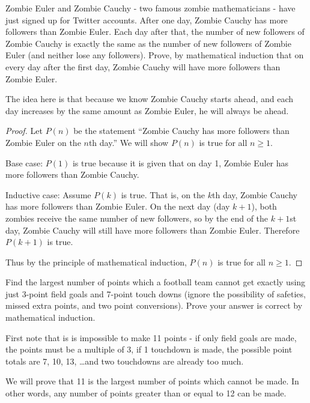 \documentclass[11pt]{exam}
\begin{document}
\begin{questions}
\question[4] Zombie Euler and Zombie Cauchy - two famous zombie mathematicians - have just signed up for Twitter accounts.  After one day, Zombie Cauchy has more followers than Zombie Euler.  Each day after that, the number of new followers of Zombie Cauchy is exactly the same as the number of new followers of Zombie Euler (and neither lose any followers).  Prove, by mathematical induction that on every day after the first day, Zombie Cauchy will have more followers than Zombie Euler.

\begin{solution}
  The idea here is that because we know Zombie Cauchy starts ahead, and each day increases by the same amount as Zombie Euler, he will always be ahead.
  
  \begin{proof}
    Let $P(n)$ be the statement ``Zombie Cauchy has more followers than Zombie Euler on the $n$th day.''  We will show $P(n)$ is true for all $n \ge 1$.
    
    Base case: $P(1)$ is true because it is given that on day 1, Zombie Euler has more followers than Zombie Cauchy.
    
    Inductive case: Assume $P(k)$ is true.  That is, on the $k$th day, Zombie Cauchy has more followers than Zombie Euler.  On the next day (day $k+1$), both zombies receive the same number of new followers, so by the end of the $k+1$st day, Zombie Cauchy will still have more followers than Zombie Euler.  Therefore $P(k+1)$ is true.
    
    Thus by the principle of mathematical induction, $P(n)$ is true for all $n \ge 1$.
  \end{proof}

\end{solution}


\question[4] Find the largest number of points which a football team cannot get exactly using just 3-point field goals and 7-point touch downs (ignore the possibility of safeties, missed extra points, and two point conversions).  Prove your answer is correct by mathematical induction.

\begin{solution}
  First note that is is impossible to make 11 points - if only field goals are made, the points must be a multiple of 3, if 1 touchdown is made, the possible point totals are 7, 10, 13, \ldots and two touchdowns are already too much.
  
  We will prove that 11 is the largest number of points which cannot be made.  In other words, any number of points greater than or equal to 12 can be made.
  

\end{solution}
\end{questions}
\end{document}
